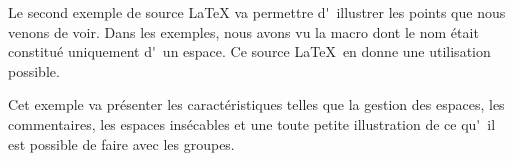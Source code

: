 \documentclass{article}
\begin{document}
Le second exemple de source {\LaTeX} va
permettre d\'~illustrer les points que nous
venons de voir. Dans les exemples, nous
avons vu la macro dont le nom \'etait
constitu\'e uniquement d\'~un espace. Ce
source \LaTeX\ en donne une utilisation
possible.

Cet exemple va pr\'esenter les
caract\'eristiques telles que
la gestion des espaces,
les commentaires, %
les espaces ins\'ecables et
une toute petite illustration de ce
qu\'~il est possible de faire avec
les groupes.
\end{document}
